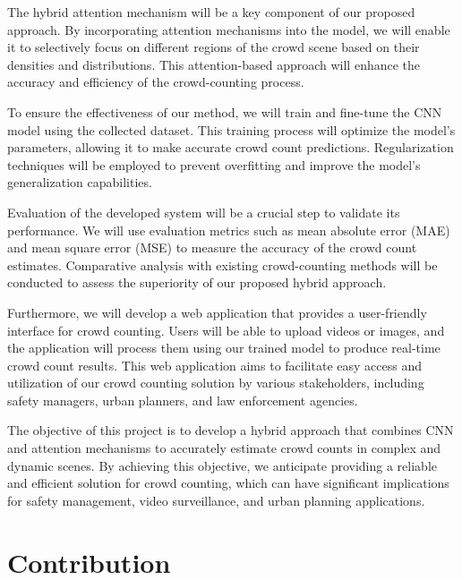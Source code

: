 \documentclass[12pt]{report}
\begin{document}
The hybrid attention mechanism will be a key component of our proposed approach. By incorporating attention mechanisms into the model, we will enable it to selectively focus on different regions of the crowd scene based on their densities and distributions. This attention-based approach will enhance the accuracy and efficiency of the crowd-counting process.
\newline

To ensure the effectiveness of our method, we will train and fine-tune the CNN model using the collected dataset. This training process will optimize the model's parameters, allowing it to make accurate crowd count predictions. Regularization techniques will be employed to prevent overfitting and improve the model's generalization capabilities.
\newline

Evaluation of the developed system will be a crucial step to validate its performance. We will use evaluation metrics such as mean absolute error (MAE) and mean square error (MSE) to measure the accuracy of the crowd count estimates. Comparative analysis with existing crowd-counting methods will be conducted to assess the superiority of our proposed hybrid approach.
\newline

Furthermore, we will develop a web application that provides a user-friendly interface for crowd counting. Users will be able to upload videos or images, and the application will process them using our trained model to produce real-time crowd count results. This web application aims to facilitate easy access and utilization of our crowd counting solution by various stakeholders, including safety managers, urban planners, and law enforcement agencies.
\newline

The objective of this project is to develop a hybrid approach that combines CNN and attention mechanisms to accurately estimate crowd counts in complex and dynamic scenes. By achieving this objective, we anticipate providing a reliable and efficient solution for crowd counting, which can have significant implications for safety management, video surveillance, and urban planning applications.
\newline


\section{Contribution}
\end{document}
